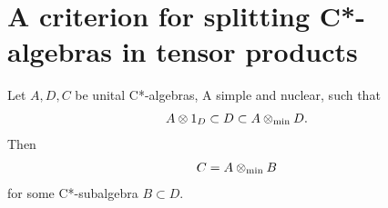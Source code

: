 \section{A criterion for splitting C*-algebras in tensor products}
\cite{zsido2000criterion}
\begin{theorem}
  Let $A, D, C$ be unital C*-algebras, A simple and nuclear, such that
  \begin{align*}
    A \otimes 1_D \subset D \subset A \otimes_{\rm min}D. 
  \end{align*}
  Then
  \begin{align*}
    C = A \otimes_{\rm min} B
  \end{align*}
  for some C*-subalgebra $B \subset D$.
\end{theorem}
